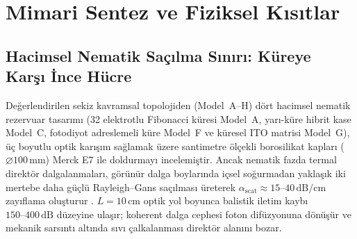 \documentclass[journal]{IEEEtran}
\begin{document}
\section{Mimari Sentez ve Fiziksel K\i{}s\i{}tlar}

\subsection{Hacimsel Nematik Sa\c{c}\i{}lma S\i{}n\i{}r\i{}: K\"ureye Kar\c{s}\i{} \.{I}nce H\"ucre}
De\u{g}erlendirilen sekiz kavramsal topolojiden (Model~A--H) d\"ort hacimsel nematik rezervuar tasar\i{}m\i{} (32 elektrotlu Fibonacci k\"uresi Model~A, yar\i{}-k\"ure hibrit kase Model~C, fotodiyot adreslemeli k\"ure Model~F ve k\"uresel ITO matrisi Model~G), \"u\c{c} boyutlu optik kar\i{}\c{s}\i{}m sa\u{g}lamak \"uzere santimetre \"ol\c{c}ekli borosilikat kaplar\i{} ($\varnothing 100\,\text{mm}$) Merck E7 ile doldurmay\i{} incelemi\c{s}tir. Ancak nematik fazda termal direkt\"or dalgalanmalar\i{}, g\"or\"un\"ur dalga boylar\i{}nda i\c{c}sel so\u{g}urmadan yakla\c{s}\i{}k iki mertebe daha g\"u\c{c}l\"u Rayleigh--Gans sa\c{c}\i{}lmas\i{} \"ureterek $\alpha_{\mathrm{scat}} \approx 15\text{--}40\,\text{dB/cm}$ zay\i{}flama olu\c{s}turur \cite{wu1987scattering}. $L = 10\,\text{cm}$ optik yol boyunca balistik iletim kayb\i{} $150\text{--}400\,\text{dB}$ d\"uzeyine ula\c{s}\i{}r; koherent dalga cephesi foton dif\"uzyonuna d\"on\"u\c{s}\"ur ve mekanik sars\i{}nt\i{} alt\i{}nda s\i{}v\i{} \c{c}alkalanmas\i{} direkt\"or alan\i{}n\i{} bozar.
\end{document}
